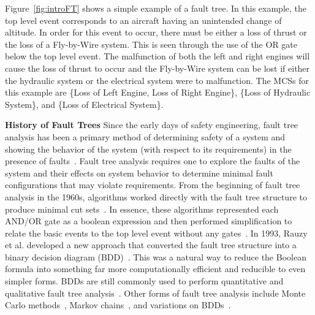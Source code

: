 Figure~\ref{fig:introFT} shows a simple example of a fault tree. In this example, the top level event corresponds to an aircraft having an unintended change of altitude. In order for this event to occur, there must be either a loss of thrust or the loss of a Fly-by-Wire system. This is seen through the use of the OR gate below the top level event. The malfunction of both the left and right engines will cause the loss of thrust to occur and the Fly-by-Wire system can be lost if either the hydraulic system or the electrical system were to malfunction. The MCSs for this example are \{Loss of Left Engine, Loss of Right Engine\}, \{Loss of Hydraulic System\}, and \{Loss of Electrical System\}. 


\textbf{History of Fault Trees} 
Since the early days of safety engineering, fault tree analysis has been a primary method of determining safety of a system and showing the behavior of the system (with respect to its requirements) in the presence of faults~\cite{0f356f05e72f43018211b36f97c8854a,vesely1981fault}. Fault tree analysis requires one to explore the faults of the system and their effects on system behavior to determine minimal fault configurations that may violate requirements. From the beginning of fault tree analysis in the 1960s, algorithms worked directly with the fault tree structure to produce minimal cut sets~\cite{10020219108,semanderes1971elraft}. In essence, these algorithms represented each AND/OR gate as a boolean expression and then performed simplification to relate the basic events to the top level event without any gates~\cite{0f356f05e72f43018211b36f97c8854a}. In 1993, Rauzy et al. developed a new approach that converted the fault tree structure into a binary decision diagram (BDD)~\cite{rauzy1993new}. This was a natural way to reduce the Boolean formula into something far more computationally efficient and reducible to even simpler forms. BDDs are still commonly used to perform quantitative and qualitative fault tree analysis~\cite{sinnamon1997new,bryant1986graph,aralia1996computation,reay2002fault,rauzy2007assessment,ge2015quantitative,jiang2018algebraic,banov2019new}.  Other forms of fault tree analysis include Monte Carlo methods~\cite{vesely1970prep}, Markov chains~\cite{boudali2007dynamic}, and variations on BDDs~\cite{minato2001zero}. 




